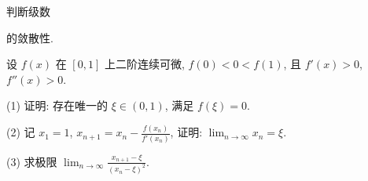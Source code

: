 \nopagebreak[4]
\par{}
判断级数\par
\nopagebreak[4]
的敛散性.\par
设 $f(x)$ 在 $[0,1]$ 上二阶连续可微, $f(0) < 0 < f(1)$, 且 $f'(x) > 0$, $f''(x) > 0$.\par
(1) 证明: 存在唯一的 $\xi \in (0,1)$, 满足 $f(\xi) = 0$.\par
(2) 记 $x_{1} = 1$, $x_{n+1} = x_{n} - \frac{f(x_{n})}{f'(x_{n})}$, 证明: $\lim_{n \to \infty} x_{n} = \xi$.\par
(3) 求极限 $\lim_{n\to \infty}\frac{x_{n + 1} - \xi}{(x_n - \xi)^2}.$\par
